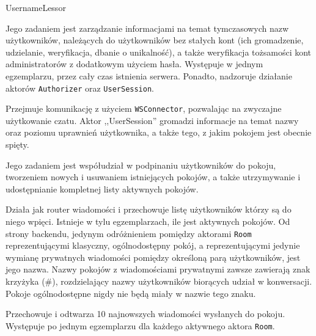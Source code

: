 \begin{labeling}{UsernameLessor}
  \item[\texttt{UsernameLessor}] Jego zadaniem jest zarządzanie informacjami na
  temat tymczasowych nazw użytkowników, należących do	użytkowników bez stałych
  kont (ich gromadzenie, udzielanie, weryfikacja, dbanie o unikalność), a także
  weryfikacja tożsamości kont administratorów z dodatkowym użyciem hasła.
  Występuje w jednym egzemplarzu, przez cały czas istnienia serwera. Ponadto,
  nadzoruje działanie aktorów \texttt{Authorizer} oraz \texttt{UserSession}.

  \item[\texttt{UserSession}] Przejmuje komunikację z użyciem
  \texttt{WSConnector}, pozwalając na zwyczajne użytkowanie czatu. Aktor
  ,,UserSession'' gromadzi informacje na temat nazwy oraz poziomu uprawnień
  użytkownika, a także tego, z jakim pokojem jest obecnie spięty.

  \item[\texttt{Landlord}] Jego zadaniem jest współudział w podpinaniu
  użytkowników do pokoju, tworzeniem nowych i usuwaniem istniejących pokojów, a
  także utrzymywanie i udostępnianie kompletnej listy aktywnych pokojów.

  \item[\texttt{Room}] Działa jak router wiadomości i przechowuje listę użytkowników którzy są do niego wpięci. Istnieje w tylu egzemplarzach, ile jest aktywnych pokojów. Od strony
	backendu, jedynym odróżnieniem pomiędzy aktorami \texttt{Room} reprezentującymi
	klasyczny, ogólnodostępny pokój, a reprezentującymi jedynie wymianę prywatnych
	wiadomości pomiędzy określoną parą użytkowników, jest jego nazwa. Nazwy pokojów
	z wiadomościami prywatnymi zawsze zawierają znak krzyżyka (\#),
	rozdzielający nazwy użytkowników biorących udział w konwersacji. Pokoje
	ogólnodostępne nigdy nie będą miały w nazwie tego znaku.

  \item[\texttt{MessageBuffer}] Przechowuje i odtwarza 10 najnowszych wiadomości wysłanych do pokoju. Występuje po jednym egzemplarzu dla każdego aktywnego aktora \texttt{Room}.

\end{labeling}

